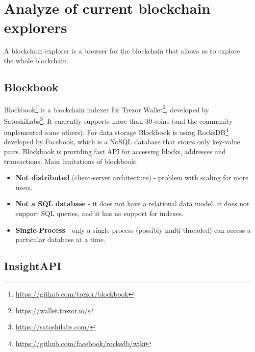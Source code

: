 \section{Analyze of current blockchain explorers}
A blockchain explorer is a browser for the blockchain that allows us to explore the whole blockchain.


\subsection{Blockbook}
Blockbook\footnote{\url{https://github.com/trezor/blockbook}} is a blockchain indexer for Trezor Wallet\footnote{\url{https://wallet.trezor.io/}}, developed by SatoshiLabs\footnote{\url{https://satoshilabs.com/}}. It currently supports more than 30 coins (and the community implemented some others). For data storage Blockbook is using RocksDB\footnote{\url{https://github.com/facebook/rocksdb/wiki}} developed by Facebook, which is a NoSQL database that stores only key-value pairs. Blockbook is providing fast API for accessing blocks, addresses and transactions. Main limitations of blockbook:
\begin{itemize}
    \item \textbf{Not distributed} (client-server architecture) - problem with scaling for more users. 
    \item \textbf{Not a SQL database} - it does not have a relational data model, it does not support SQL queries, and it has no support for indexes.
    \item \textbf{Single-Process} - only a single process (possibly multi-threaded) can access a particular database at a time.
\end{itemize}

\subsection{InsightAPI}
